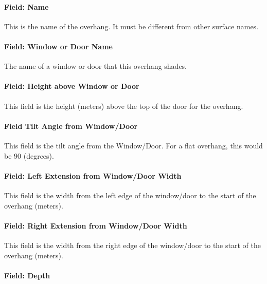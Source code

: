 \paragraph{Field: Name}\label{field-name-24-003}

This is the name of the overhang. It must be different from other surface names.

\paragraph{Field: Window or Door Name}\label{field-window-or-door-name}

The name of a window or door that this overhang shades.

\paragraph{Field: Height above Window or Door}\label{field-height-above-window-or-door}

This field is the height (meters) above the top of the door for the overhang.

\paragraph{Field Tilt Angle from Window/Door}\label{field-tilt-angle-from-windowdoor}

This field is the tilt angle from the Window/Door. For a flat overhang, this would be 90 (degrees).

\paragraph{Field: Left Extension from Window/Door Width}\label{field-left-extension-from-windowdoor-width}

This field is the width from the left edge of the window/door to the start of the overhang (meters).

\paragraph{Field: Right Extension from Window/Door Width}\label{field-right-extension-from-windowdoor-width}

This field is the width from the right edge of the window/door to the start of the overhang (meters).

\paragraph{Field: Depth}\label{field-depth}

